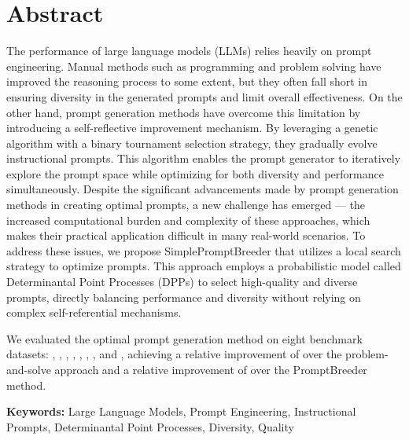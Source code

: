 \chapter*{\vspace{-3cm}\fontsize{14}{15}\selectfont Abstract}
\thispagestyle{empty}
\vspace{-1.5cm}\setlength{\parindent}{20pt}\fontsize{12}{13}\selectfont
The performance of large language models (LLMs) relies heavily on prompt engineering. Manual methods such as programming and problem solving have improved the reasoning process to some extent, but they often fall short in ensuring diversity in the generated prompts and limit overall effectiveness. 
On the other hand, prompt generation methods have overcome this limitation by introducing a self-reflective improvement mechanism. By leveraging a genetic algorithm with a binary tournament selection strategy, they gradually evolve instructional prompts. This algorithm enables the prompt generator to iteratively explore the prompt space while optimizing for both diversity and performance simultaneously.
Despite the significant advancements made by prompt generation methods in creating optimal prompts, a new challenge has emerged — the increased computational burden and complexity of these approaches, which makes their practical application difficult in many real-world scenarios.
To address these issues, we propose SimplePromptBreeder that utilizes a local search strategy to optimize prompts. This approach employs a probabilistic model called Determinantal Point Processes (DPPs) to select high-quality and diverse prompts, directly balancing performance and diversity without relying on complex self-referential mechanisms.

We evaluated the optimal prompt generation method on eight benchmark datasets: 
, 
, 
, 
, 
, 
, 
, and 
, 
achieving a relative improvement of  over the problem-and-solve approach and a relative improvement of  over the PromptBreeder method.

\par\vspace{.5cm}\setlength{\parindent}{0pt}
\textbf{Keywords:} Large Language Models, Prompt Engineering, Instructional Prompts, Determinantal Point Processes, Diversity, Quality




 \par\vspace{.5cm}

